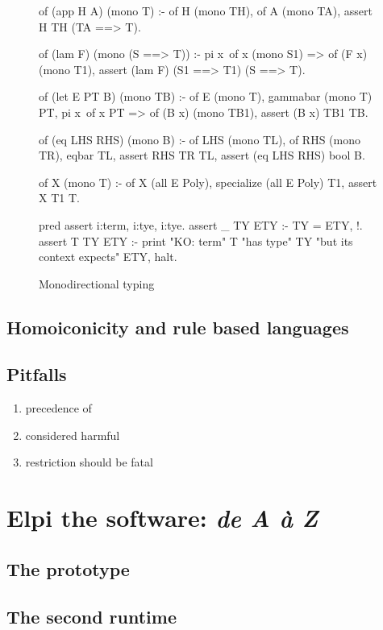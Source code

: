 \documentclass[a4paper, 11pt]{book}
\begin{document}
\begin{figure}
\begin{elpicode}
of (app H A) (mono T) :-
  of H (mono TH),
  of A (mono TA),
  assert H TH (TA ==> T).

of (lam F) (mono (S ==> T)) :-
  pi x\ of x (mono S1) => of (F x) (mono T1),
  assert (lam F) (S1 ==> T1) (S ==> T).

of (let E PT B) (mono TB) :-
  of E (mono T),
  gammabar (mono T) PT,
  pi x\ of x PT => of (B x) (mono TB1),
  assert (B x) TB1 TB.

of (eq LHS RHS) (mono B) :-
  of LHS (mono TL),
  of RHS (mono TR),
  eqbar TL,
  assert RHS TR TL,
  assert (eq LHS RHS) bool B.

of X (mono T) :- of X (all E Poly), specialize (all E Poly) T1, assert X T1 T.

pred assert i:term, i:tye, i:tye.
assert _ TY ETY :- TY = ETY, !.
assert T TY ETY :-
  print "KO: term" T "has type" TY "but its context expects" ETY, halt.
\end{elpicode}
\caption[monodirectional]{Monodirectional typing\label{hm:mono}}
\end{figure}

\section{Homoiconicity and rule based languages}

\section{Pitfalls}

\begin{enumerate}
  \item precedence of \elpiinline{=>}
  \item {} considered harmful
  \item restriction should be fatal
\end{enumerate}

\chapter{Elpi the software: \emph{de A \`a Z}}

\section{The prototype}

\section{The second runtime}
\end{document}
